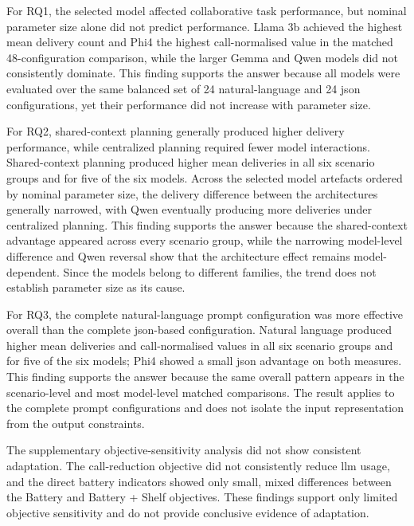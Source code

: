 For RQ1, the selected model affected collaborative task performance, but nominal parameter size alone did not predict performance. Llama 3b achieved the highest mean delivery count and Phi4 the highest call-normalised value in the matched 48-configuration comparison, while the larger Gemma and Qwen models did not consistently dominate. This finding supports the answer because all models were evaluated over the same balanced set of 24 natural-language and 24 \gls{json} configurations, yet their performance did not increase with parameter size.

For RQ2, shared-context planning generally produced higher delivery performance, while centralized planning required fewer model interactions. Shared-context planning produced higher mean deliveries in all six scenario groups and for five of the six models. Across the selected model artefacts ordered by nominal parameter size, the delivery difference between the architectures generally narrowed, with Qwen eventually producing more deliveries under centralized planning. This finding supports the answer because the shared-context advantage appeared across every scenario group, while the narrowing model-level difference and Qwen reversal show that the architecture effect remains model-dependent. Since the models belong to different families, the trend does not establish parameter size as its cause.

For RQ3, the complete natural-language prompt configuration was more effective overall than the complete \gls{json}-based configuration. Natural language produced higher mean deliveries and call-normalised values in all six scenario groups and for five of the six models; Phi4 showed a small \gls{json} advantage on both measures. This finding supports the answer because the same overall pattern appears in the scenario-level and most model-level matched comparisons. The result applies to the complete prompt configurations and does not isolate the input representation from the output constraints.

The supplementary objective-sensitivity analysis did not show consistent adaptation. The call-reduction objective did not consistently reduce \gls{llm} usage, and the direct battery indicators showed only small, mixed differences between the Battery and Battery + Shelf objectives. These findings support only limited objective sensitivity and do not provide conclusive evidence of adaptation.
